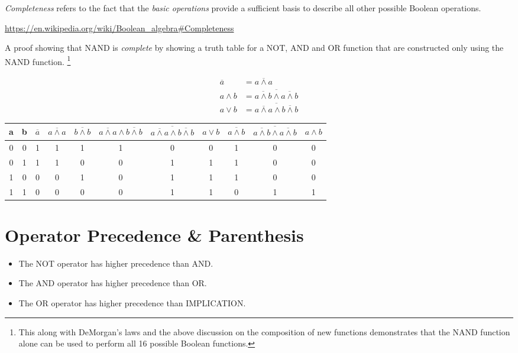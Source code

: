 \documentclass[10pt]{article}
\begin{document}
{\em Completeness} refers to the fact that the {\em basic operations}
provide a sufficient basis to describe all other possible Boolean
operations.

\url{https://en.wikipedia.org/wiki/Boolean_algebra#Completeness}


A proof showing that NAND is {\em complete} by showing a truth table 
for a NOT, AND and OR function that are constructed only using 
the NAND function.
\footnote{This along with DeMorgan's laws and the above discussion on the
composition of new functions demonstrates that the NAND function alone
can be used to perform all 16 possible Boolean functions.}

\begin{align}
\overline{a} &= \overline{a\land a} \\
a\land b &= \overline{\overline{a\land b}\land\overline{a\land b}}	\\
a\lor b &= \overline{\overline{a\land a}\land\overline{b\land b}}
\end{align}

\begin{center}
\begin{tabular}{|cc|ccccccccc|}
a & b & 
		$\overline{a}$ &
		$\overline{a\land a}$ &
		$\overline{b\land b}$ &
		$\overline{a\land a}\land\overline{b\land b}$ &
		$\overline{\overline{a\land a}\land\overline{b\land b}}$ &
		$a\lor b$ &
		$\overline{a\land b}$ &
		$\overline{\overline{a\land b}\land\overline{a\land b}}$ &
		$a\land b$
		\\
\hline
0 & 0 & 1 & 1 & 1 & 1 & 0 & 0 & 1 & 0 & 0 \\
0 & 1 & 1 & 1 & 0 & 0 & 1 & 1 & 1 & 0 & 0 \\
1 & 0 & 0 & 0 & 1 & 0 & 1 & 1 & 1 & 0 & 0 \\
1 & 1 & 0 & 0 & 0 & 0 & 1 & 1 & 0 & 1 & 1 \\
\hline
\end{tabular}
\end{center}


\section{Operator Precedence \& Parenthesis}

\begin{itemize}
\item The NOT operator has higher precedence than AND.
\item The AND operator has higher precedence than OR.
\item The OR operator has higher precedence than IMPLICATION.
\end{itemize}
\end{document}
